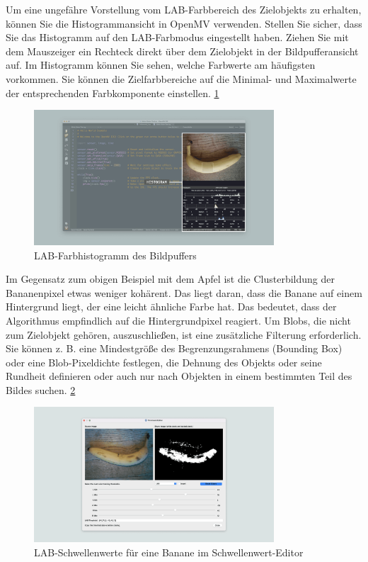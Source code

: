 Um eine ungefähre Vorstellung vom LAB-Farbbereich des Zielobjekts zu erhalten, können Sie die Histogrammansicht in OpenMV verwenden. Stellen Sie sicher, dass Sie das Histogramm auf den LAB-Farbmodus eingestellt haben. Ziehen Sie mit dem Mauszeiger ein Rechteck direkt über dem Zielobjekt in der Bildpufferansicht auf. Im Histogramm können Sie sehen, welche Farbwerte am häufigsten vorkommen. Sie können die Zielfarbbereiche auf die Minimal- und Maximalwerte der entsprechenden Farbkomponente einstellen.  \ref{OpenMVHisto} 

\begin{figure}
	\includegraphics[width=0.8\textwidth]{OpenMV/OpenMVHisto}
	
	\caption{LAB-Farbhistogramm des Bildpuffers}
	\label{OpenMVHisto}
\end{figure}




Im Gegensatz zum obigen Beispiel mit dem Apfel ist die Clusterbildung der Bananenpixel etwas weniger kohärent. Das liegt daran, dass die Banane auf einem Hintergrund liegt, der eine leicht ähnliche Farbe hat. Das bedeutet, dass der Algorithmus empfindlich auf die Hintergrundpixel reagiert. Um Blobs, die nicht zum Zielobjekt gehören, auszuschließen, ist eine zusätzliche Filterung erforderlich. Sie können z. B. eine Mindestgröße des Begrenzungsrahmens (Bounding Box) oder eine Blob-Pixeldichte festlegen, die Dehnung des Objekts oder seine Rundheit definieren oder auch nur nach Objekten in einem bestimmten Teil des Bildes suchen. \ref{OpenMVBanana}


\begin{figure}
	\includegraphics[width=0.8\textwidth]{OpenMV/OpenMVThre}
	
	\caption{LAB-Schwellenwerte für eine Banane im Schwellenwert-Editor}
	\label{OpenMVBanana}
\end{figure}




